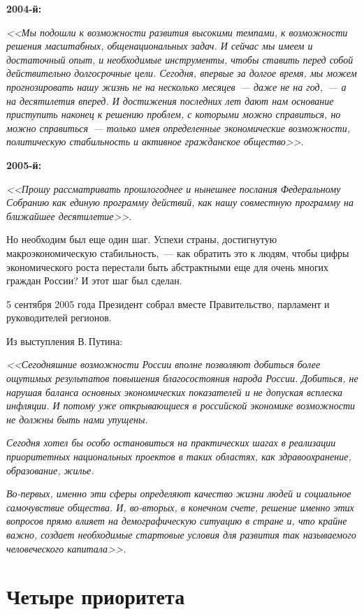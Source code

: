 \documentclass[article, 12pt, russian, oneside]{ncc}
\begin{document}
\textbf{2004-й:}

\emph{<<Мы подошли к возможности развития высокими темпами, к
  возможности решения масштабных, общенациональных задач. И сейчас мы
  имеем и достаточный опыт, и необходимые инструменты, чтобы ставить
  перед собой действительно долгосрочные цели. Сегодня, впервые за
  долгое время, мы можем прогнозировать нашу жизнь не на несколько
  месяцев~--- даже не на год,~--- а на десятилетия вперед. И
  достижения последних лет дают нам основание приступить наконец к
  решению проблем, с которыми можно справиться, но можно
  справиться~--- только имея определенные экономические возможности,
  политическую стабильность и активное гражданское общество>>}\cite{Putin_2004}.

\textbf{2005-й:}

\emph{<<Прошу рассматривать прошлогоднее и нынешнее послания
  Федеральному Собранию как единую программу действий, как нашу
  совместную программу на ближайшее десятилетие>>}\cite{Putin_2005}.

Но необходим был еще один шаг. Успехи страны, достигнутую
макроэкономическую стабильность,~--- как обратить это к людям, чтобы
цифры экономического роста перестали быть абстрактными еще для очень
многих граждан России? И этот шаг был сделан.

5 сентября 2005 года Президент собрал вместе Правительство, парламент
и руководителей регионов.

Из выступления В.\,Путина:

\emph{<<Сегодняшние возможности России вполне позволяют добиться более
  ощутимых результатов повышения благосостояния народа
  России. Добиться, не нарушая баланса основных экономических
  показателей и не допуская всплеска инфляции. И потому уже
  открывающиеся в российской экономике возможности не должны быть нами
  упущены.}
    
\emph{ Сегодня хотел бы особо остановиться на практических шагах в
  реализации приоритетных национальных проектов в таких областях, как
  здравоохранение, образование, жилье.}

\emph{Во-первых, именно эти сферы определяют качество жизни людей и
  социальное самочувствие общества. И, во-вторых, в конечном счете,
  решение именно этих вопросов прямо влияет на демографическую
  ситуацию в стране и, что крайне важно, создает необходимые стартовые
  условия для развития так называемого человеческого капитала>>.}
\newpage


\section{Четыре приоритета}
\end{document}
